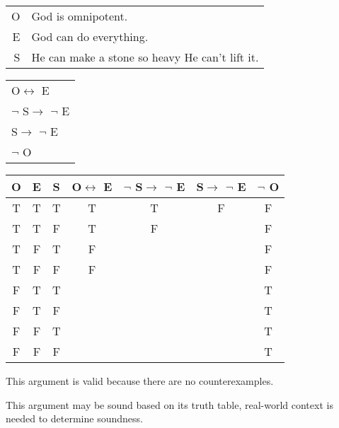 \section{}
\centering
\begin{tabular}{r l}
    O & God is omnipotent. \\
    E & God can do everything. \\
    S & He can make a stone so heavy He can't lift it.
\end{tabular}
\begin{tabular}{l}
    O$\leftrightarrow$ E\\
    $\lnot$ S$\rightarrow$ $\lnot$ E\\
    S$\rightarrow$ $\lnot$ E\\
    \hline
    $\lnot$ O
\end{tabular}

\begin{tabular}{c|c|c||c|c|c||c}
    O & E & S & O$\leftrightarrow$ E & $\lnot$ S$\rightarrow$ $\lnot$ E & S$\rightarrow$ $\lnot$ E & $\lnot$ O \\
    \hline
    T & T & T & T & T & F & F \\
    T & T & F & T & F &   & F \\
    T & F & T & F &   &   & F \\
    T & F & F & F &   &   & F \\
    F & T & T &   &   &   & T \\
    F & T & F &   &   &   & T \\
    F & F & T &   &   &   & T \\
    F & F & F &   &   &   & T
\end{tabular}

\justifying
\noindent This argument is valid because there are no counterexamples.

\noindent This argument may be sound based on its truth table, real-world context is needed to determine soundness.